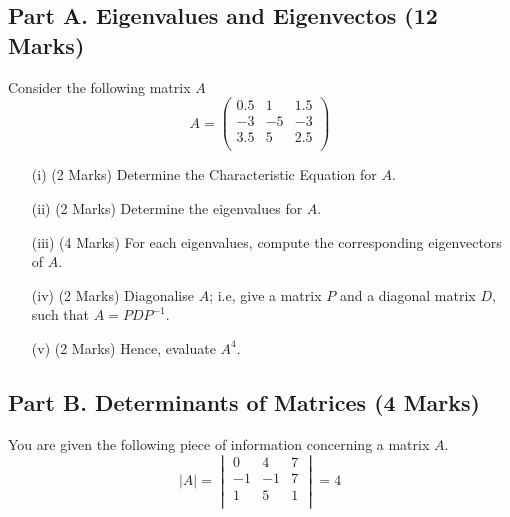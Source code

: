 \documentclass[a4paper,12pt]{article}
\begin{document}
	\subsection*{Part A. Eigenvalues and Eigenvectos (12 Marks)}
	Consider the following matrix $A$ 
	\[
	A = \left(\begin{array}{rrr} 
	0.5 & 1 & 1.5 \\
	-3  & -5 & -3\\
	3.5 & 5  & 2.5 \\ \end{array}\right)
	\]	
	\begin{itemize}
		\item[(i)] (2 Marks) Determine the Characteristic Equation for $A$.
		\item[(ii)] (2 Marks) Determine the eigenvalues for $A$.
		\item[(iii)] (4 Marks) For each eigenvalues, compute the corresponding eigenvectors of $A$.
		
		\medskip\item[(iv)] (2 Marks) Diagonalise $A$; i.e, give a matrix $P$ and a diagonal matrix $D$, such that $A=PDP^{-1}$.
		
		\medskip \item[(v)] (2 Marks) Hence, evaluate $A^4$.
	\end{itemize} \vspace{0.4cm}
	
	
	
	
\subsection*{Part B. Determinants of Matrices (4 Marks)}

You are given the following piece of information concerning a matrix $A$.
\[|A| = \begin{vmatrix}
0  &  4   & 7 \\
-1  & -1  &  7\\
1   & 5  &  1\\
\end{vmatrix} = 4 \]
\end{document}
